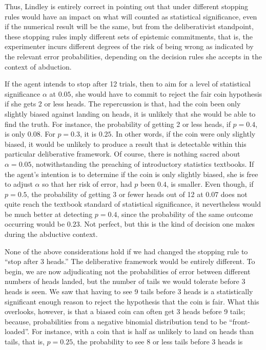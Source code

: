 Thus, Lindley is
entirely correct in pointing out that under different stopping rules
would have an impact on what will counted as statistical significance,
even if the numerical result will be the same, but from the
deliberativist standpoint, these stopping rules imply different sets of
epistemic commitments, that is, the experimenter incurs different degrees of the risk of being wrong as indicated by the relevant error probabilities, depending on the decision rules she accepts in the context of abduction.

If the agent intends to stop after 12 trials, then to aim for a level of
statistical significance \(\alpha\) at \(0.05\), she would have to
commit to reject the fair coin hypothesis if she gets 2 or less heads.
The repercussion is that, had the coin been only slightly biased against
landing on heads, it is unlikely that she would be able to find the
truth. For instance, the probability of getting 2 or less heads, if
\(p=0.4\), is only \(0.08\). For \(p=0.3\), it is \(0.25\). In other
words, if the coin were only slightly biased, it would be unlikely to
produce a result that is detectable within this particular
deliberative framework. Of course, there is nothing sacred about
\(\alpha= 0.05\), notwithstanding the preaching of introductory
statistics textbooks. If the agent's intention is to determine if the
coin is only slightly biased, she is free to adjust \(\alpha\) so that
her risk of error, had \(p\) been \(0.4\), is smaller. Even though, if
\(p=0.5\), the probability of getting 3 or fewer heads out of 12 at
\(0.07\) does not quite reach the textbook standard of statistical
significance, it nevertheless would be much better at detecting
\(p=0.4\), since the probability of the same outcome occurring would be
\(0.23\). Not perfect, but this is the kind of decision one makes during
the abductive context.

None of the above considerations hold if we had changed the stopping
rule to ``stop after 3 heads.'' The deliberative framework would be
entirely different. To begin, we are now adjudicating not the
probabilities of error between different numbers of heads landed, but
the number of tails we would tolerate before 3 heads is seen. We saw
that having to see 9 tails before 3 heads is a statistically significant
enough reason to reject the hypothesis that the coin is fair. What this
overlooks, however, is that a biased coin can often get 3 heads before 9
tails; because, probabilities from a negative binomial distribution tend
to be ``front-loaded''. For instance, with a coin that is half as
unlikely to land on heads than tails, that is, \(p=0.25\), the
probability to see 8 or less tails before 3 heads is

